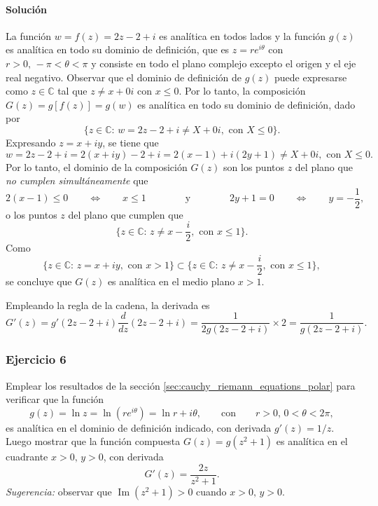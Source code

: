 \documentclass[a4paper]{report}
\renewcommand{\Im}{\operatorname{Im}}
\begin{document}
\paragraph{Solución} La función \(w=f(z)=2z-2+i\) es analítica en todos lados y la función \(g(z)\) es analítica en todo su dominio de definición, que es \(z=re^{i\theta}\) con \(r>0,\,-\pi<\theta<\pi\) y consiste en todo el plano complejo excepto el origen y el eje real negativo. Observar que el dominio de definición de \(g(z)\) puede expresarse como \(z\in\mathbb{C}\) tal que \(z\neq x+0i\) con \(x\leq0\). Por lo tanto, la composición \(G(z)=g[f(z)]=g(w)\) es analítica en todo su dominio de definición, dado por
\[
 \{z\in\mathbb{C}:\,w=2z-2+i\neq X+0i,\textrm{ con }X\leq0\}.
\]
Expresando \(z=x+iy\), se tiene que
\[
 w=2z-2+i=2(x+iy)-2+i=2(x-1)+i(2y+1)\neq X+0i,\textrm{ con }X\leq0.
\]
Por lo tanto, el dominio de la composición \(G(z)\) son los puntos \(z\) del plano que \emph{no cumplen simultáneamente} que
\[
 2(x-1)\leq0\qquad\Leftrightarrow\qquad
 x\leq1
 \qquad\qquad\textrm{y}\qquad\qquad
 2y+1=0\qquad\Leftrightarrow\qquad
 y=-\frac{1}{2},
\]
o los puntos \(z\) del plano que cumplen que 
\[
 \{z\in\mathbb{C}:\,z\neq x-\frac{i}{2},\textrm{ con }x\leq1\}.
\]
Como
\[
 \{z\in\mathbb{C}:\,z=x+iy,\textrm{ con }x>1\}\subset\{z\in\mathbb{C}:\,z\neq x-\frac{i}{2},\textrm{ con }x\leq1\},
\]
se concluye que \(G(z)\) es analítica en el medio plano \(x>1\).

Empleando la regla de la cadena, la derivada es
\[
 G'(z)=g'(2z-2+i)\frac{d}{dz}(2z-2+i)=\frac{1}{2g(2z-2+i)}\times2=\frac{1}{g(2z-2+i)}.
\]


\subsubsection{Ejercicio 6}

Emplear los resultados de la sección \ref{sec:cauchy_riemann_equations_polar} para verificar que la función
\[
 g(z)=\ln z=\ln(re^{i\theta})=\ln r+i\theta,\qquad\textrm{con}\qquad r>0,\,0<\theta<2\pi,
\]
es analítica en el dominio de definición indicado, con derivada \(g'(z)=1/z\). Luego mostrar que la función compuesta \(G(z)=g(z^2+1)\) es analítica en el cuadrante \(x>0,\,y>0\), con derivada
\[
 G'(z)=\frac{2z}{z^2+1}.
\]
\emph{Sugerencia:} observar que \(\Im(z^2+1)>0\) cuando \(x>0,\,y>0\).
\end{document}
